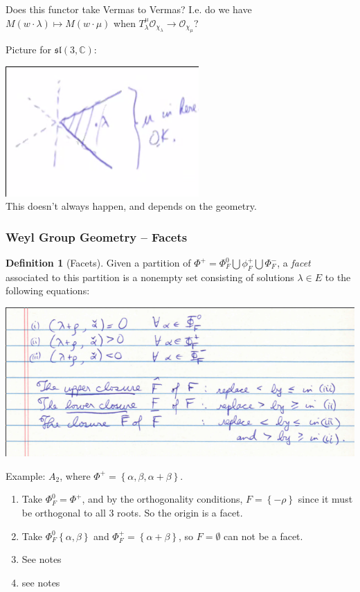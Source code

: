 \documentclass[11pt]{scrartcl}
\theoremstyle{definition}
\theoremstyle{theorem}
\theoremstyle{proof}
\theoremstyle{definition}
\newtheorem{definition}{Definition}[theorem]
\theoremstyle{break}
\theoremstyle{problem}
\providecommand{\tightlist}{%
  \setlength{\itemsep}{0pt}\setlength{\parskip}{0pt}}
\newcommand{\CC}[0]{{\mathbb{C}}}
\newcommand{\liesl}[0]{{\mathfrak{sl}}}
\newcommand{\OO}[0]{{\mathcal{O}}}
\newcommand{\theset}[1]{\left\{{#1}\right\}}
\newcommand{\union}[0]{\bigcup}
\renewcommand{\to}[0]{\longrightarrow}
\begin{document}
Does this functor take Vermas to Vermas? I.e. do we have
\(M(w\cdot \lambda) \mapsto M(w\cdot \mu)\) when
\(T_\lambda^\mu \OO_{\chi_\lambda} \to \OO_{\chi_\mu}\)?

Picture for \(\liesl(3, \CC)\):

\includegraphics{figures/image_2020-04-10-09-32-13.png}\\

This doesn't always happen, and depends on the geometry.

\hypertarget{weyl-group-geometry-facets}{%
\subsubsection{Weyl Group Geometry --
Facets}\label{weyl-group-geometry-facets}}

\begin{definition}[Facets]

Given a partition of
\(\Phi^+ = \Phi^0_F \union \phi^+_F \union \Phi^-_F\), a \emph{facet}
associated to this partition is a nonempty set consisting of solutions
\(\lambda \in E\) to the following equations:

\includegraphics{figures/image_2020-04-10-09-36-18.png}\\
\end{definition}

Example: \(A_2\), where
\(\Phi^+ = \theset{\alpha, \beta, \alpha + \beta}\).

\begin{enumerate}
\def\labelenumi{\arabic{enumi}.}
\tightlist
\item
  Take \(\Phi_F^0 = \Phi^+\), and by the orthogonality conditions,
  \(F = \theset{-\rho}\) since it must be orthogonal to all 3 roots. So
  the origin is a facet.
\item
  Take \(\Phi_F^0 \theset{\alpha, \beta}\) and
  \(\Phi_F^+ = \theset{\alpha + \beta}\), so \(F = \emptyset\) can not
  be a facet.
\item
  See notes
\item
  see notes
\end{enumerate}
\end{document}
